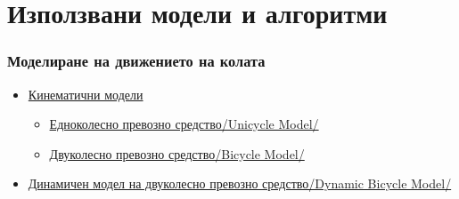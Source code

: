 \documentclass[hyperref=unicode]{beamer}
\begin{document}
\section{Използвани модели и алгоритми}
    \begin{frame}
      \frametitle{Моделиране на движението на колата}
      \begin{itemize}
        \item{\hyperlink{monocycle}{Кинематични модели}}
        \begin{itemize}
          \item{\hyperlink{monocycle}{Едноколесно превозно средство/Unicycle Model/}}
          \item{\hyperlink{bicycle}{Двуколесно превозно средство/Bicycle Model/}}
        \end{itemize}
        \item{\hyperlink{dynamic}{Динамичен модел на двуколесно превозно средство/Dynamic Bicycle Model/}}
      \end{itemize}
    \end{frame}
\end{document}
